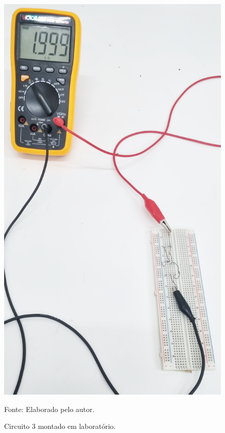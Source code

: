 \documentclass[12pt]{article}
\begin{document}
    \begin{figure}[H]
        \centering
        \caption{Circuito 3 montado em laboratório.}
        \begin{minipage}{0.3\textwidth}
            \centering
            \includegraphics[width=\textwidth]{external-figures/parte3.png}\\
            \raggedright\footnotesize{Fonte: Elaborado pelo autor.}
            \label{fig:pratica3}
        \end{minipage}
    \end{figure}
\end{document}
